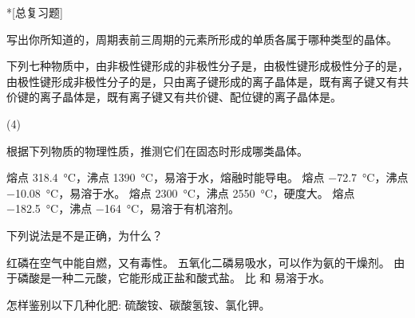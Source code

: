 \begin{Exercise}*[总复习题]
\begin{question}
  \item 写出你所知道的，周期表前三周期的元素所形成的单质各属于哪种类型的晶体。
  \item 下列七种物质中，由非极性键形成的非极性分子是，由极性键形成极性分子的是，由极性键形成非极性分子的是，只由离子键形成的离子晶体是，既有离子键又有共价键的离子晶体是，既有离子键又有共价键、配位键的离子晶体是。
  \begin{tasks}[label=\Alph*.](4)
    \task {}
    \task {}
    \task {}
    \task {}
    \task {}
    \task {}
    \task {}
  \end{tasks}
  \item 根据下列物质的物理性质，推测它们在固态时形成哪类晶体。
  \begin{tasks}
    \task {}\quad 熔点 \qty{318.4}{\celsius}，沸点 \qty{1390}{\celsius}，易溶于水，熔融时能导电。
    \task {}\quad 熔点 \qty{-72.7}{\celsius}，沸点 \qty{-10.08}{\celsius}，易溶于水。
    \task {}\quad 熔点 \qty{2300}{\celsius}，沸点 \qty{2550}{\celsius}，硬度大。
    \task {}\quad 熔点 \qty{-182.5}{\celsius}，沸点 \qty{-164}{\celsius}，易溶于有机溶剂。
  \end{tasks}
  \item 下列说法是不是正确，为什么？
  \begin{tasks}
    \task 红磷在空气中能自燃，又有毒性。
    \task 五氧化二磷易吸水，可以作为氨的干燥剂。
    \task 由于磷酸是一种二元酸，它能形成正盐和酸式盐。
    \task {} 比  和  易溶于水。
  \end{tasks}
  \item 怎样鉴别以下几种化肥: 硫酸铵、碳酸氢铵、氯化钾。

\end{question}
\end{Exercise}
